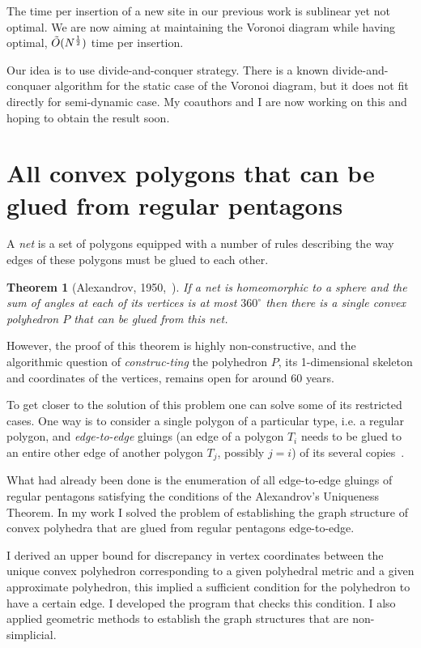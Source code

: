 \documentclass[a4paper,11pt]{article}
\def\vsection#1{\vspace{-4mm}\section{#1}\vspace{-3mm}}
\newtheorem{theorem}{Theorem}
\theoremstyle{definition}
\begin{document}
The time per insertion of a new site in our previous work is sublinear yet not optimal. We are now aiming at maintaining the Voronoi diagram while having optimal, $\tilde O(N^{\frac12})$ time per insertion.

Our idea is to use divide-and-conquer strategy. There is a known divide-and-conquaer algorithm for the static case of the Voronoi diagram, but it does not fit directly for semi-dynamic case. My coauthors and I are now working on this and hoping to obtain the result soon.

\vsection{All convex polygons that can be glued from regular pentagons}

	A \emph{net} is a set of polygons equipped with a number of rules describing the way edges of these polygons must be glued to each other.

\vspace{-2mm} \begin{theorem}[Alexandrov, 1950,~\cite{alex}]
\label{thm:alexandrov}
	If a net is homeomorphic to a sphere and the sum of angles at each of its vertices is at most $360^\circ$ then there is a single convex polyhedron $P$ that can be glued from this net.
\end{theorem} \vspace{-3mm}

However, the proof of this theorem is highly non-constructive, and the algorithmic question of {\it construc-\linebreak ting} the polyhedron $P$, its 1-dimensional skeleton and coordinates of the vertices, remains open for around 60 years.

To get closer to the solution of this problem one can solve some of its restricted cases. One way is to consider a single polygon of a particular type, i.e. a regular polygon, and {\it edge-to-edge} gluings (an edge of a polygon $T_i$ needs to be glued to an entire other edge of another polygon $T_j$, possibly $j=i$) of its several copies~\cite{gfalop}.

What had already been done is the enumeration of all edge-to-edge gluings of regular pentagons satisfying the conditions of the Alexandrov's Uniqueness Theorem. In my work I solved the problem of establishing the graph structure of convex polyhedra that are glued from regular pentagons edge-to-edge.

I derived an upper bound for discrepancy in vertex coordinates between the unique convex polyhedron corresponding to a given polyhedral metric and a given approximate polyhedron, this implied a sufficient condition for the polyhedron to have a certain edge. I developed the program that checks this condition. I also applied geometric methods to establish the graph structures that are non-simplicial.
\end{document}

